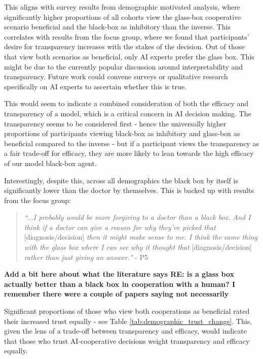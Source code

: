 \documentclass[manuscript,screen,review]{acmart}
\begin{document}
This aligns with survey results from demographic motivated analysis, where significantly higher proportions of all cohorts view the glass-box cooperative scenario beneficial and the black-box as inhibitory than the inverse. This correlates with results from the focus group, where we found that participants' desire for transparency increases with the stakes of the decision. Out of those that view both scenarios as beneficial, only AI experts prefer the glass box. This might be due to the currently popular discussion around interpretability and transparency. Future work could convene surveys or qualitative research specifically on AI experts to ascertain whether this is true.

This would seem to indicate a combined consideration of both the efficacy and transparency of a model, which is a critical concern in AI decision making. The transparency seems to be considered first - hence the universally higher proportions of participants viewing black-box as inhibitory and glass-box as beneficial compared to the inverse - but if a participant views the transparency as a fair trade-off for efficacy, they are more likely to lean towards the high efficacy of our model black-box agent.

Interestingly, despite this, across all demographics the black box by itself is significantly lower than the doctor by themselves. This is backed up with results from the focus group:

\begin{quote}
    \textit{``...I probably would be more forgiving to a doctor than a black box. And I think if a doctor can give a reason for why they’ve picked that} [diagnosis/decision] \textit{then it might make sense to me. I think the same thing with the glass box where I can see why it thought that} [diagnosis/decision] \textit{rather than just giving an answer."} - P5
\end{quote}

\textbf{Add a bit here about what the literature says RE: is a glass box actually better than a black box in cooperation with a human? I remember there were a couple of papers saying not necessarily}

Significant proportions of those who view both cooperations as beneficial rated their increased trust equally - see Table \ref{tab:demographic_trust_change}. This, given the lens of a trade-off between transparency and efficacy, would indicate that those who trust AI-cooperative decisions weight transparency and efficacy equally. 
\end{document}
